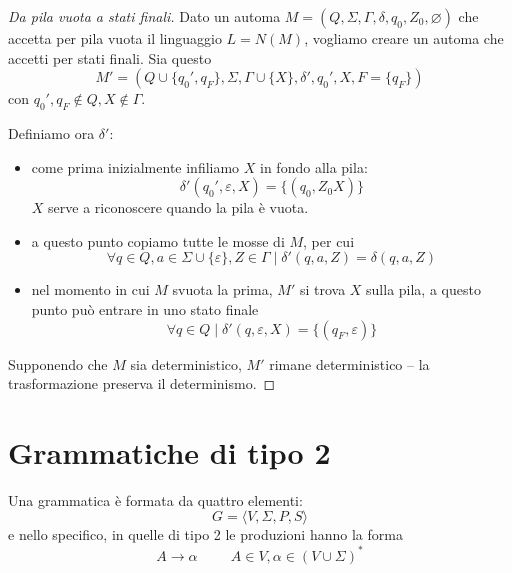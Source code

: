 \documentclass[12pt]{report}
\theoremstyle{definition}
\begin{document}
\begin{proof}[Da pila vuota a stati finali]
Dato un automa $M = (Q, \Sigma, \Gamma,\delta, q_0, Z_0, \varnothing)$ che accetta per pila vuota il linguaggio $L = N(M)$, vogliamo creare un automa che accetti per stati finali.
Sia questo 
$$M' = (Q \cup \{q_0', q_F\}, \Sigma, \Gamma \cup \{X\}, \delta', q_0', X, F = \{q_F\})$$
con $q_0', q_F \not \in Q, X \not \in \Gamma$.

Definiamo ora $\delta'$:
\begin{itemize}
	\item come prima inizialmente infiliamo $X$ in fondo alla pila:
		$$ \delta'(q_0', \varepsilon, X) = \{(q_0, Z_0X)\} $$
		$X$ serve a riconoscere quando la pila è vuota.
	\item a questo punto copiamo tutte le mosse di $M$, per cui
		$$ \forall q \in Q, a \in \Sigma \cup \{\varepsilon\}, Z \in \Gamma \mid \delta'(q, a, Z) = \delta(q, a, Z) $$
	\item nel momento in cui $M$ svuota la prima, $M'$ si trova $X$ sulla pila, a questo punto può entrare in uno stato finale
		$$ \forall q \in Q \mid \delta'(q, \varepsilon, X) = \{(q_F, \varepsilon)\}$$
\end{itemize}
Supponendo che $M$ sia deterministico, $M'$ rimane deterministico -- la trasformazione preserva il determinismo.
\end{proof}

\chapter{Grammatiche di tipo 2}
Una grammatica è formata da quattro elementi:
$$ G = \langle V, \Sigma, P, S \rangle $$
e nello specifico, in quelle di tipo 2 le produzioni hanno la forma
$$ A \rightarrow \alpha \hspace{1cm} A \in V, \alpha \in (V \cup \Sigma)^* $$
\end{document}
